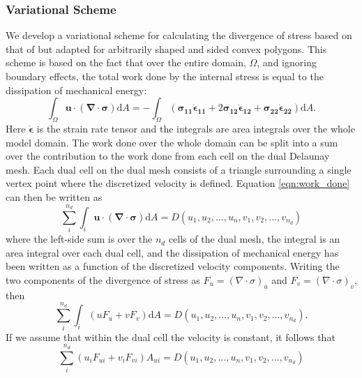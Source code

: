 \subsubsection{Variational Scheme}

We develop a variational scheme for calculating the divergence of stress based on that of \citet{Hunke02} but adapted for arbitrarily shaped and sided convex polygons. This scheme is based on the fact that over the entire domain, $\Omega$, and ignoring boundary effects, the total work done by the internal stress is equal to the dissipation of mechanical energy:
\begin{equation}
\int_\Omega \boldsymbol{u} \cdot (\boldsymbol{\nabla} \cdot \boldsymbol{\sigma}) \mathrm{d}A = -\int_\Omega (\boldsymbol{\sigma_{11}} \boldsymbol{\dot{\epsilon}_{11}}  + 2 \boldsymbol{\sigma_{12}} \boldsymbol{\dot{\epsilon}_{12}} + \boldsymbol{\sigma_{22}} \boldsymbol{\dot{\epsilon}_{22}}) \mathrm{d}A.
\label{eqn:work_done}
\end{equation}
Here $\boldsymbol{\dot{\epsilon}}$ is the strain rate tensor and the integrals are area integrals over the whole model domain. The work done over the whole domain can be split into a sum over the contribution to the work done from each cell on the dual Delaunay mesh. Each dual cell on the dual mesh consists of a triangle surrounding a single vertex point where the discretized velocity is defined. Equation \ref{eqn:work_done} can then be written as
\begin{equation}
\sum_i^{n_d} \int_i \boldsymbol{u} \cdot (\boldsymbol{\nabla} \cdot \boldsymbol{\sigma}) \mathrm{d}A = D(u_1, u_2, ..., u_n, v_1, v_2, ..., v_{n_d})
\end{equation}
where the left-side sum is over the $n_d$ cells of the dual mesh, the integral is an area integral over each dual cell,  and the dissipation of mechanical energy has been written as a function of the discretized velocity components.
Writing the two components of the divergence of stress as $F_u=(\nabla \cdot \sigma)_u$ and $F_v=(\nabla \cdot \sigma)_v$, then
\begin{equation}
\sum_i^{n_d} \int_i (uF_u + vF_v) \mathrm{d}A = D(u_1, u_2, ..., u_n, v_1, v_2, ..., v_{n_d}).
\end{equation}
If we assume that within the dual cell the velocity is constant, it follows that
\begin{equation}
\sum_i^{n_d} (u_i F_{ui} + v_i F_{vi}) A_{ui} = D(u_1, u_2, ..., u_n, v_1, v_2, ..., v_{n_d})
\end{equation}
